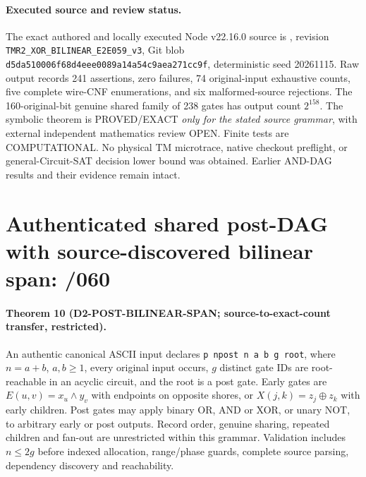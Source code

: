 \documentclass[11pt]{article}
\begin{document}
\paragraph{Executed source and review status.}
The exact authored and locally executed Node v22.16.0 source is , revision \texttt{TMR2\_XOR\_BILINEAR\_E2E059\_v3}, Git blob \texttt{d5da510006f68d4eee0089a14a54c9aea271cc9f}, deterministic seed 20261115. Raw output  records 241 assertions, zero failures, 74 original-input exhaustive counts, five complete wire-CNF enumerations, and six malformed-source rejections. The 160-original-bit genuine shared family of 238 gates has output count $2^{158}$. The symbolic theorem is PROVED/EXACT \emph{only for the stated source grammar}, with external independent mathematics review OPEN. Finite tests are COMPUTATIONAL. No physical TM microtrace, native checkout preflight, or general-Circuit-SAT decision lower bound was obtained. Earlier AND-DAG results and their evidence remain intact.

\section{Authenticated shared post-DAG with source-discovered bilinear span: /060}
\paragraph{Theorem 10 (D2-POST-BILINEAR-SPAN; source-to-exact-count transfer, restricted).}
An authentic canonical ASCII input declares \texttt{p npost n a b g root}, where $n=a+b$, $a,b\ge1$, every original input occurs, $g$ distinct gate IDs are root-reachable in an acyclic circuit, and the root is a post gate. Early gates are $E(u,v)=x_u\wedge y_v$ with endpoints on opposite shores, or $X(j,k)=z_j\oplus z_k$ with early children. Post gates may apply binary OR, AND or XOR, or unary NOT, to arbitrary early or post outputs. Record order, genuine sharing, repeated children and fan-out are unrestricted within this grammar. Validation includes $n\le2g$ before indexed allocation, range/phase guards, complete source parsing, dependency discovery and reachability.
\end{document}
